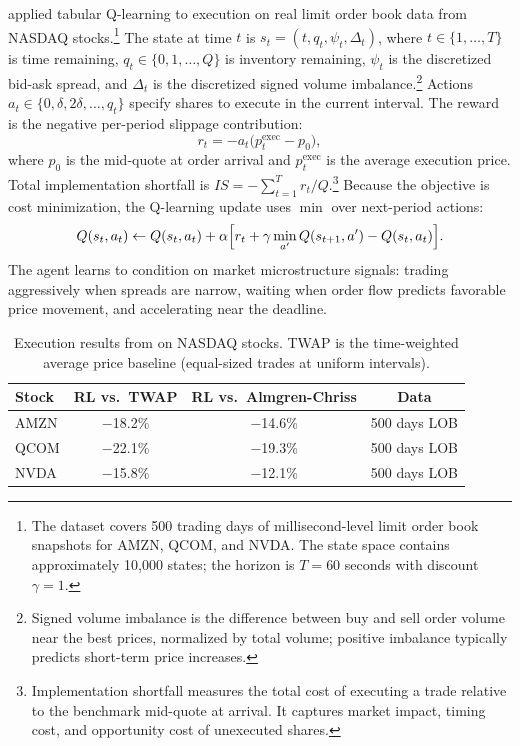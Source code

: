 \citet{Nevmyvaka2006execution} applied tabular Q-learning to execution on real limit order book data from NASDAQ stocks.\footnote{The dataset covers 500 trading days of millisecond-level limit order book snapshots for AMZN, QCOM, and NVDA. The state space contains approximately 10,000 states; the horizon is $T = 60$ seconds with discount $\gamma = 1$.} The state at time $t$ is $s_t = (t, q_t, \psi_t, \Delta_t)$, where $t \in \{1,\ldots,T\}$ is time remaining, $q_t \in \{0,1,\ldots,Q\}$ is inventory remaining, $\psi_t$ is the discretized bid-ask spread, and $\Delta_t$ is the discretized signed volume imbalance.\footnote{Signed volume imbalance is the difference between buy and sell order volume near the best prices, normalized by total volume; positive imbalance typically predicts short-term price increases.} Actions $a_t \in \{0, \delta, 2\delta, \ldots, q_t\}$ specify shares to execute in the current interval. The reward is the negative per-period slippage contribution:
\begin{equation}
r_t = -a_t \bigl(p_t^{\text{exec}} - p_0\bigr),
\end{equation}
where $p_0$ is the mid-quote at order arrival and $p_t^{\text{exec}}$ is the average execution price. Total implementation shortfall is $IS = -\sum_{t=1}^T r_t / Q$.\footnote{Implementation shortfall measures the total cost of executing a trade relative to the benchmark mid-quote at arrival. It captures market impact, timing cost, and opportunity cost of unexecuted shares.} Because the objective is cost minimization, the Q-learning update uses $\min$ over next-period actions:
\begin{equation}
Q(s_t, a_t) \leftarrow Q(s_t, a_t) + \alpha\Bigl[r_t + \gamma \min_{a'} Q(s_{t+1}, a') - Q(s_t, a_t)\Bigr].
\end{equation}
The agent learns to condition on market microstructure signals: trading aggressively when spreads are narrow, waiting when order flow predicts favorable price movement, and accelerating near the deadline.

\begin{table}[htbp]
\centering
\caption{Execution results from \citet{Nevmyvaka2006execution} on NASDAQ stocks. TWAP is the time-weighted average price baseline (equal-sized trades at uniform intervals).}
\label{tab:execution_results}
\begin{tabular}{lccc}
\toprule
Stock & RL vs.\ TWAP & RL vs.\ Almgren-Chriss & Data \\
\midrule
AMZN & $-$18.2\% & $-$14.6\% & 500 days LOB \\
QCOM & $-$22.1\% & $-$19.3\% & 500 days LOB \\
NVDA & $-$15.8\% & $-$12.1\% & 500 days LOB \\
\bottomrule
\end{tabular}
\end{table}

